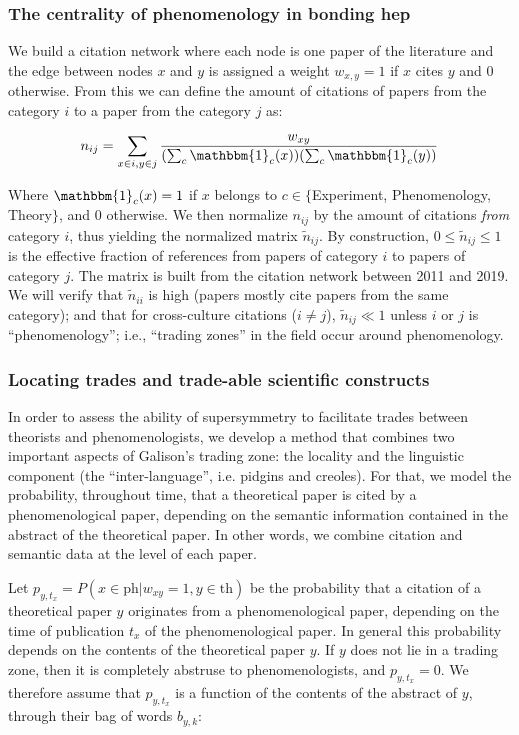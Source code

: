 \documentclass[smallextended]{svjour3}
\begin{document}
\subsubsection{The centrality of phenomenology in bonding \gls{hep}}

We build a citation network where each node is one paper of the literature and the edge between nodes $x$ and $y$ is assigned a weight $w_{x,y}=1$ if $x$ cites $y$ and 0 otherwise. From this we can define the amount of citations of papers from the category $i$ to a paper from the category $j$ as: 

\begin{equation}
    \label{eq:cite_matrix}
    n_{ij} = \sum_{x\in i, y\in j} \dfrac{w_{xy}}{(\sum_c \mathbbm{1}_c(x))(\sum_c \mathbbm{1}_c(y))} 
\end{equation}

Where $\mathbbm{1}_c(x)=1$ if $x$ belongs to $c \in \{$Experiment, Phenomenology, Theory$\}$, and 0 otherwise. 
We then normalize $n_{ij}$ by the amount of citations \textit{from} category $i$, thus yielding the normalized matrix $\tilde{n}_{ij}$. By construction, $0\leq \tilde{n}_{ij}\leq 1$ is the effective fraction of references from papers of category $i$ to papers of category $j$. The matrix is built from the citation network between 2011 and 2019. We will verify that $\tilde{n}_{ii}$ is high (papers mostly cite papers from the same category); and that for cross-culture citations ($i\neq j$), $\tilde{n}_{ij} \ll 1$ unless $i$ or $j$ is ``phenomenology''; i.e., ``trading zones'' in the field occur around phenomenology. 

\subsubsection{Locating trades and trade-able scientific constructs}

In order to assess the ability of supersymmetry to facilitate trades between theorists and phenomenologists, we develop a method that combines two important aspects of Galison's trading zone: the locality and the linguistic component (the ``inter-language'', i.e. pidgins and creoles). For that, we model the probability, throughout time, that a theoretical paper is cited by a phenomenological paper, depending on the semantic information contained in the abstract of the theoretical paper. In other words, we combine citation and semantic data at the level of each paper.

Let  $p_{y,t_x} = P(x \in \text{ph}|w_{xy}=1,y \in \text{th})$ be the probability that a 
citation of a theoretical paper $y$ originates from a phenomenological paper, depending on the time of publication $t_x$ of the phenomenological paper. In general this probability depends on the contents of the theoretical paper $y$. If $y$ does not lie in a trading zone, then it is completely abstruse to phenomenologists, and $p_{y,t_x}=0$. We therefore assume that $p_{y,t_x}$ is a function of the contents of the abstract of $y$, through their bag of words $b_{y,k}$:
\end{document}
